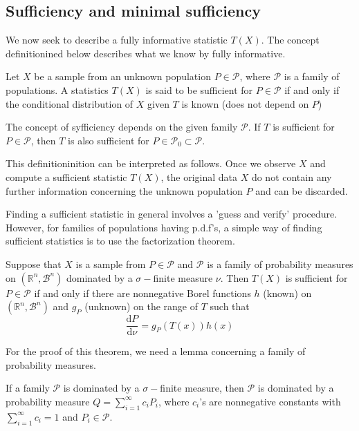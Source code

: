 \subsection{Sufficiency and minimal sufficiency}
We now seek to describe a fully informative statistic $T(X)$. The concept definitionined below describes what we know by fully informative.
\begin{definition}[sufficiency]
Let $X$ be a sample from an unknown population $P\in\mathcal{P}$, where $\mathcal{P}$ is a family of populations. A statistics $T(X)$ is said to be sufficient for $P\in\mathcal{P}$ if and only if the conditional distribution of $X$ given $T$ is known (does not depend on $P$)
\end{definition}
\begin{remark}
The concept of syfficiency depends on the given family $\mathcal{P}$. If $T$ is sufficient for $P\in\mathcal{P}$, then $T$ is also sufficient for $P\in\mathcal{P}_0\subset\mathcal{P}$.
\end{remark}
This definitioninition can be interpreted as follows. Once we observe $X$ and compute a sufficient statistic $T(X)$, the original data $X$ do not contain any further information concerning the unknown population $P$ and can be discarded.\par
Finding a sufficient statistic in general involves a 'guess and verify' procedure. However, for families of populations having p.d.f's, a simple way of finding sufficient statistics is to use the factorization theorem.
\begin{theorem}
Suppose that $X$ is a sample from $P\in\mathcal{P}$ and $\mathcal{P}$ is a family of probability measures on $(\mathbb{R}^n,\mathcal{B}^n)$ dominated by a $\sigma-$finite measure $\nu$. Then $T(X)$ is sufficient for $P\in\mathcal{P}$ if and only if there are nonnegative Borel functions $h$ (known) on $(\mathbb{R}^n,\mathcal{B}^n)$ and $g_P$ (unknown) on the range of $T$ such that
\[\frac{\mathrm{d} P}{\mathrm{d} \nu} =g_P(T(x))h(x)\]
\end{theorem}
For the proof of this theorem, we need a lemma concerning a family of probability measures.
\begin{lemma}
If a family $\mathcal{P}$ is dominated by a $\sigma-$finite measure, then $\mathcal{P}$ is dominated by a probability measure $Q=\sum_{i=1}^\infty c_iP_i$, where $c_i$'s are nonnegative constants with $\sum_{i=1}^\infty c_i=1$ and $P_i\in\mathcal{P}$.
\end{lemma}


